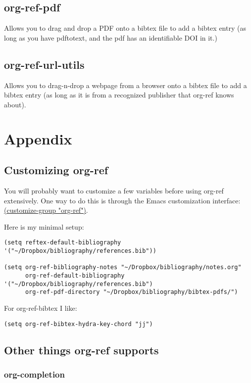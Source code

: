 \documentclass[11pt]{article}
\begin{document}
{\subsection{org-ref-pdf}
\label{sec:orgheadline28}
Allows you to drag and drop a PDF onto a bibtex file to add a bibtex entry (as long as you have pdftotext, and the pdf has an identifiable DOI in it.)

\subsection{org-ref-url-utils}
\label{sec:orgheadline29}
Allows you to drag-n-drop a webpage from a browser onto a bibtex file to add a bibtex entry (as long as it is from a recognized publisher that org-ref knows about).
\section{Appendix}
\label{sec:orgheadline37}
\subsection{Customizing org-ref}
\label{sec:orgheadline1}

You will probably want to customize a few variables before using org-ref extensively. One way to do this is through the Emacs customization interface: \url{(customize-group "org-ref")}.

Here is my minimal setup:
\begin{verbatim}
(setq reftex-default-bibliography '("~/Dropbox/bibliography/references.bib"))

(setq org-ref-bibliography-notes "~/Dropbox/bibliography/notes.org"
      org-ref-default-bibliography '("~/Dropbox/bibliography/references.bib")
      org-ref-pdf-directory "~/Dropbox/bibliography/bibtex-pdfs/")
\end{verbatim}

For org-ref-bibtex I like:

\begin{verbatim}
(setq org-ref-bibtex-hydra-key-chord "jj")
\end{verbatim}

\subsection{Other things org-ref supports}
\label{sec:orgheadline36}
\subsubsection{org-completion}
\label{sec:orgheadline31}
 

}
\end{document}
